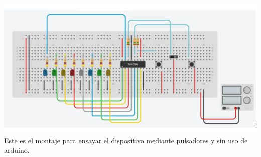 \documentclass{article}
\begin{document}
\includegraphics[scale=0.7]{Captura1.JPG}\\
Este es el montaje para ensayar el dispositivo mediante pulsadores y sin uso de arduino.\\
\end{document}

